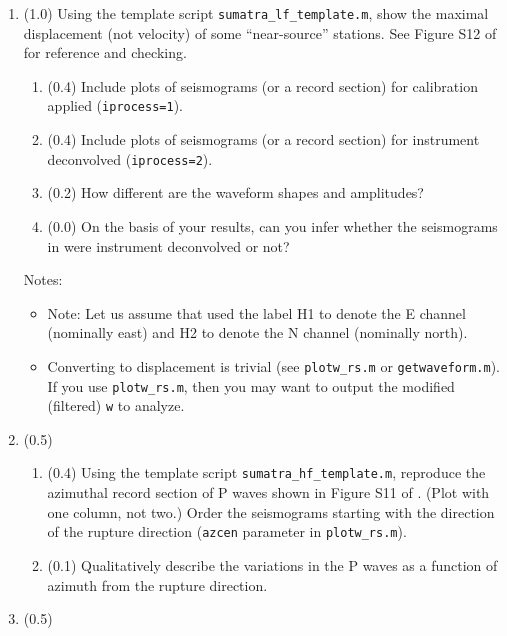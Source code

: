 \documentclass[11pt,titlepage,fleqn]{article}
\begin{document}
\begin{enumerate}
\item (1.0) Using the template script \verb+sumatra_lf_template.m+, show the maximal displacement (not velocity) of some ``near-source'' stations. See Figure S12 of \citet{Ammon2005} for reference and checking.

%
\begin{enumerate}
\item (0.4) Include plots of seismograms (or a record section) for calibration applied (\verb+iprocess=1+).
\item (0.4) Include plots of seismograms (or a record section) for instrument deconvolved (\verb+iprocess=2+).
\item (0.2) How different are the waveform shapes and amplitudes?
\item (0.0) On the basis of your results, can you infer whether the seismograms in \citet{Ammon2005} were instrument deconvolved or not?
\end{enumerate}
%
Notes:
%
\begin{itemize}
\item Note: Let us assume that \citet{Ammon2005} used the label H1 to denote the E channel (nominally east) and H2 to denote the N channel (nominally north).

\item Converting to displacement is trivial (see \verb+plotw_rs.m+ or \verb+getwaveform.m+). If you use \verb+plotw_rs.m+, then you may want to output the modified (\ie filtered) \verb+w+ to analyze.

\end{itemize}


\item (0.5) 
%
\begin{enumerate}
\item (0.4) Using the template script \verb+sumatra_hf_template.m+, reproduce the azimuthal record section of P waves shown in Figure S11 of \citet{Ammon2005}. (Plot with one column, not two.) Order the seismograms starting with the direction of the rupture direction (\verb+azcen+ parameter in \verb+plotw_rs.m+).
\item (0.1) Qualitatively describe the variations in the P waves as a function of azimuth from the rupture direction.
\end{enumerate}


\item (0.5) 

\end{enumerate}
\end{document}
